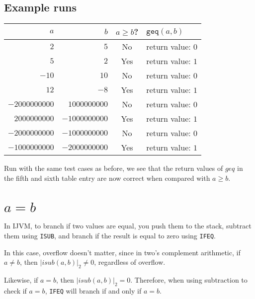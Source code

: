 \documentclass[12pt,a4paper]{article}
\begin{document}
\subsection{Example runs}

\begin{tabular}{rrcl}
	$a$ & $b$ & $a\geq b$? & $\texttt{geq}(a, b)$ \\
	\hline
	$2$ & $5$ & No & return value: $0$ \\
	$5$ & $2$ & Yes & return value: $1$ \\
	$-10$ & $10$ & No & return value: $0$ \\
	$12$ & $-8$ & Yes & return value: $1$ \\
	$-2000000000$ & $1000000000$ & No & return value: $0$ \\
	$2000000000$ & $-1000000000$ & Yes & return value: $1$ \\
	$-2000000000$ & $-1000000000$ & No & return value: $0$ \\
	$-1000000000$ & $-2000000000$ & Yes & return value: $1$
\end{tabular}

Run with the same test cases as before, we see that the return values of $geq$
in the fifth and sixth table entry are now correct when compared with $a\geq
b$.
\section{$a=b$}
In IJVM, to branch if two values are equal, you push them to the stack,
subtract them using \texttt{ISUB}, and branch if the result is equal to zero
using \texttt{IFEQ}.

In this case, overflow doesn't matter, since in two's complement arithmetic, if
$a\ne b$, then $|isub(a, b)|_2\ne 0$, regardless of overflow.

Likewise, if $a=b$, then $|isub(a, b)|_2=0$. Therefore, when using subtraction
to check if $a=b$, \texttt{IFEQ} will branch if and only if $a=b$.
\end{document}
